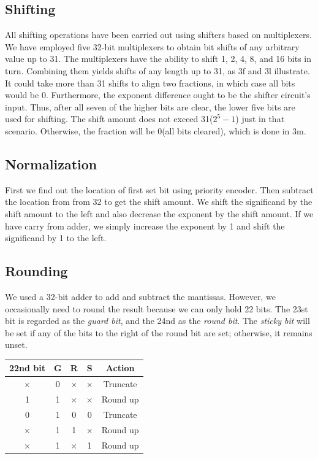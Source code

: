 \documentclass[a4paper,12pt]{article}
\begin{document}
\subsection{Shifting}
All shifting operations have been carried out using shifters based on
multiplexers. We have employed five 32-bit multiplexers to obtain bit shifts of
any arbitrary value up to 31. The multiplexers have the ability to shift 1, 2,
4, 8, and 16 bits in turn. Combining them yields shifts of any length up to 31,
as 3f and 3l illustrate. It could take more than 31 shifts to align two
fractions, in which case all bits would be 0. Furthermore, the exponent
difference ought to be the shifter circuit's input. Thus, after all seven of
the higher bits are clear, the lower five bits are used for shifting. The shift
amount does not exceed 31($2^{5}-1$) just in that scenario. Otherwise, the
fraction will be 0(all bits cleared), which is done in 3m.

\subsection{Normalization}
First we find out the location of first set bit using priority encoder. Then
subtract the location from from 32 to get the shift amount. We shift the
significand by the shift amount to the left and also decrease the exponent by
the shift amount. If we have carry from adder, we simply increase the exponent
by 1 and shift the significand by 1 to the left.

\subsection{Rounding}
We used a 32-bit adder to add and subtract the mantissas. However, we
occasionally need to round the result because we can only hold 22 bits. The
23st bit is regarded as the \textit{guard bit}, and the 24nd as the
\textit{round bit}. The \textit{sticky bit} will be set if any of the bits to
the right of the round bit are set; otherwise, it remains unset.
\begin{table}[h!]
    \centering
    \begin{tabular}{|c|c|c|c|c|}
        \hline
        22nd bit & G & R        & S        & Action   \\ \hline
        $\times$ & 0 & $\times$ & $\times$ & Truncate \\ \hline
        1        & 1 & $\times$ & $\times$ & Round up \\ \hline
        0        & 1 & 0        & 0        & Truncate \\ \hline
        $\times$ & 1 & 1        & $\times$ & Round up \\ \hline
        $\times$ & 1 & $\times$ & 1        & Round up \\ \hline
    \end{tabular}
\end{table}
\end{document}
